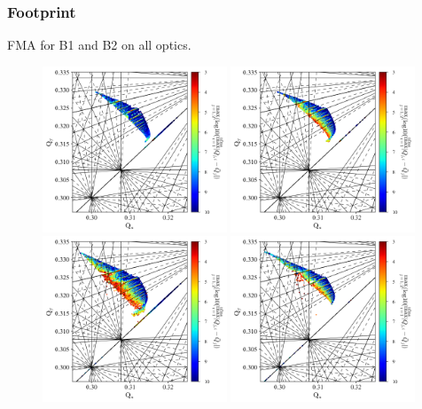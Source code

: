 \documentclass{cernatsnote}
\begin{document}
\subsubsection{Footprint}

FMA for B1 and B2 on all optics.

\begin{figure}[h!]
\centering
\includegraphics[width=0.49\textwidth]{images/fma_baseb1.png} \hfill \includegraphics[width=0.49\textwidth]{images/fma_baseb2.png} \\
\includegraphics[width=0.49\textwidth]{images/fma_noms14faltb1.png} \hfill \includegraphics[width=0.49\textwidth]{images/fma_noms14faltb2.png} \\

\end{figure}
\end{document}
